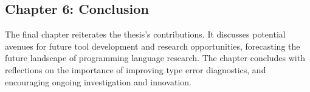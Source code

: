 \subsection*{Chapter 6: Conclusion}
The final chapter reiterates the thesis's contributions. It discusses potential avenues for future tool development and research opportunities, forecasting the future landscape of programming language research. The chapter concludes with reflections on the importance of improving type error diagnostics, and encouraging ongoing investigation and innovation.